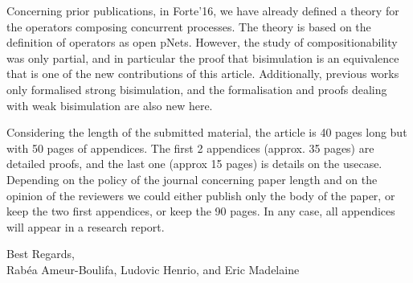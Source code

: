 \documentclass[10pt]{article}
\begin{document}
\smallskip

Concerning prior publications, in Forte'16, we have already defined a theory for the operators composing concurrent processes. The theory is based on the definition of operators as open pNets. However, the study of compositionability was only partial, and in particular the proof that bisimulation is an equivalence that is one of the new contributions of this article. Additionally, previous works only formalised strong bisimulation, and the formalisation and proofs dealing with weak bisimulation are also new here.




\smallskip

Considering the length of the submitted material, the article is 40 pages long but with 50 pages of appendices. The first 2 appendices (approx. 35 pages) are detailed proofs, and the last one (approx 15 pages) is details on the usecase.
Depending on the policy of the journal concerning paper length and on the opinion of the reviewers we could either publish only the body of the paper, or keep the two first appendices, or keep the 90 pages.
In any case, all appendices will appear in a research report.



\begin{flushright}
  Best Regards,\\
  Rab\'ea Ameur-Boulifa, Ludovic Henrio, and Eric Madelaine
\end{flushright}
\end{document}
